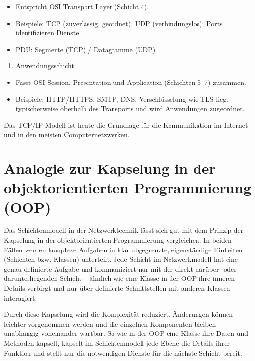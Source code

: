 \documentclass[
  nswissgerman,
  a4paper,
  DIV=11,
  numbers=noendperiod,
  ngerman]{scrreprt}
\providecommand{\tightlist}{%
  \setlength{\itemsep}{0pt}\setlength{\parskip}{0pt}}
\begin{document}
\begin{itemize}
\tightlist
\item
  Entspricht OSI Transport Layer (Schicht 4).
\item
  Beispiele: TCP (zuverlässig, geordnet), UDP (verbindungslos); Ports
  identifizieren Dienste.
\item
  PDU: Segmente (TCP) / Datagramme (UDP)
\end{itemize}

\begin{enumerate}
\def\labelenumi{\arabic{enumi})}
\setcounter{enumi}{3}
\tightlist
\item
  Anwendungsschicht
\end{enumerate}

\begin{itemize}
\tightlist
\item
  Fasst OSI Session, Presentation und Application (Schichten 5--7)
  zusammen.
\item
  Beispiele: HTTP/HTTPS, SMTP, DNS. Verschlüsselung wie TLS liegt
  typischerweise oberhalb des Transports und wird Anwendungen
  zugeordnet.
\end{itemize}

Das TCP/IP-Modell ist heute die Grundlage für die Kommunikation im
Internet und in den meisten Computernetzwerken.

\section{Analogie zur Kapselung in der objektorientierten Programmierung
(OOP)}\label{analogie-zur-kapselung-in-der-objektorientierten-programmierung-oop}

Das Schichtenmodell in der Netzwerktechnik lässt sich gut mit dem
Prinzip der Kapselung in der objektorientierten Programmierung
vergleichen. In beiden Fällen werden komplexe Aufgaben in klar
abgegrenzte, eigenständige Einheiten (Schichten bzw. Klassen)
unterteilt. Jede Schicht im Netzwerkmodell hat eine genau definierte
Aufgabe und kommuniziert nur mit der direkt darüber- oder
darunterliegenden Schicht -- ähnlich wie eine Klasse in der OOP ihre
inneren Details verbirgt und nur über definierte Schnittstellen mit
anderen Klassen interagiert.

Durch diese Kapselung wird die Komplexität reduziert, Änderungen können
leichter vorgenommen werden und die einzelnen Komponenten bleiben
unabhängig voneinander wartbar. So wie in der OOP eine Klasse ihre Daten
und Methoden kapselt, kapselt im Schichtenmodell jede Ebene die Details
ihrer Funktion und stellt nur die notwendigen Dienste für die nächste
Schicht bereit.
\end{document}
